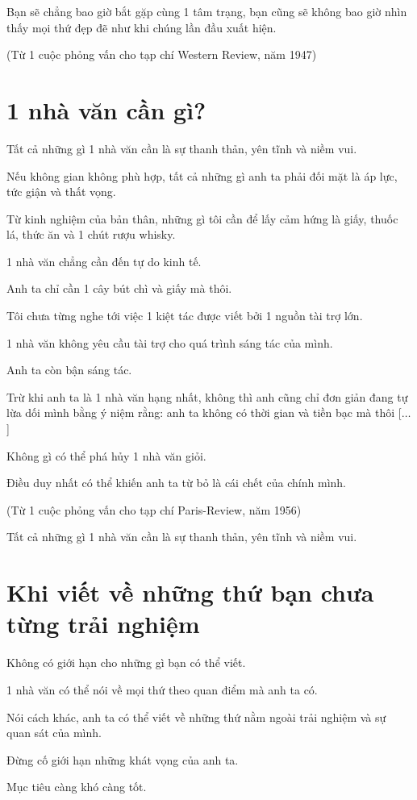 \documentclass{book}
\numberwithin{equation}{section}
\begin{document}
Bạn sẽ chẳng bao giờ bắt gặp cùng 1 tâm trạng, bạn cũng sẽ không bao giờ nhìn thấy mọi thứ đẹp đẽ như khi chúng lần đầu xuất hiện.

(Từ 1 cuộc phỏng vấn cho tạp chí Western Review, năm 1947)

\section{1 nhà văn cần gì?}
Tất cả những gì 1 nhà văn cần là sự thanh thản, yên tĩnh và niềm vui.

Nếu không gian không phù hợp, tất cả những gì anh ta phải đối mặt là áp lực, tức giận và thất vọng.

Từ kinh nghiệm của bản thân, những gì tôi cần để lấy cảm hứng là giấy, thuốc lá, thức ăn và 1 chút rượu whisky.

1 nhà văn chẳng cần đến tự do kinh tế.

Anh ta chỉ cần 1 cây bút chì và giấy mà thôi.

Tôi chưa từng nghe tới việc 1 kiệt tác được viết bởi 1 nguồn tài trợ lớn.

1 nhà văn không yêu cầu tài trợ cho quá trình sáng tác của mình.

Anh ta còn bận sáng tác.

Trừ khi anh ta là 1 nhà văn hạng nhất, không thì anh cũng chỉ đơn giản đang tự lừa dối mình bằng ý niệm rằng: anh ta không có thời gian và tiền bạc mà thôi [$\ldots$]

Không gì có thể phá hủy 1 nhà văn giỏi.

Điều duy nhất có thể khiến anh ta từ bỏ là cái chết của chính mình.

(Từ 1 cuộc phỏng vấn cho tạp chí Paris-Review, năm 1956)

\textsf{Tất cả những gì 1 nhà văn cần là sự thanh thản, yên tĩnh và niềm vui.}

\section{Khi viết về những thứ bạn chưa từng trải nghiệm}
Không có giới hạn cho những gì bạn có thể viết.

1 nhà văn có thể nói về mọi thứ theo quan điểm mà anh ta có.

Nói cách khác, anh ta có thể viết về những thứ nằm ngoài trải nghiệm và sự quan sát của mình.

Đừng cố giới hạn những khát vọng của anh ta.

Mục tiêu càng khó càng tốt.
\end{document}
